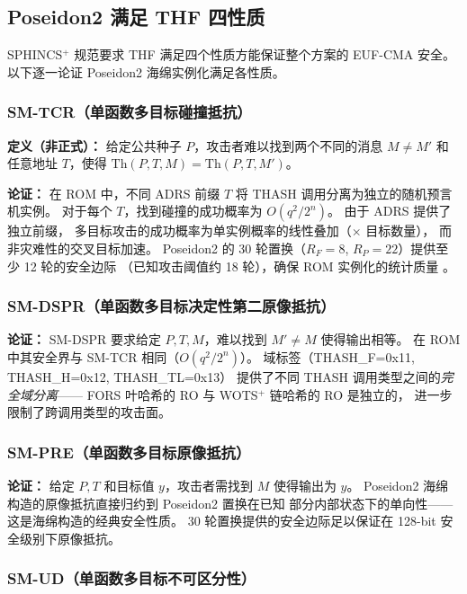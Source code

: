 \documentclass[11pt,a4paper]{ctexart}
\begin{document}
\subsection{Poseidon2 满足 THF 四性质}

SPHINCS$^+$ 规范要求 THF 满足四个性质方能保证整个方案的 EUF-CMA 安全。
以下逐一论证 Poseidon2 海绵实例化满足各性质。

\subsubsection{SM-TCR（单函数多目标碰撞抵抗）}

\textbf{定义（非正式）：}
给定公共种子 $P$，攻击者难以找到两个不同的消息 $M \neq M'$
和任意地址 $T$，使得 $\mathrm{Th}(P, T, M) = \mathrm{Th}(P, T, M')$。

\textbf{论证：}
在 ROM 中，不同 ADRS 前缀 $T$ 将 THASH 调用分离为独立的随机预言机实例。
对于每个 $T$，找到碰撞的成功概率为 $O(q^2 / 2^n)$。
由于 ADRS 提供了独立前缀，
多目标攻击的成功概率为单实例概率的线性叠加（$\times$ 目标数量），
而非灾难性的交叉目标加速。
Poseidon2 的 30 轮置换（$R_F=8$, $R_P=22$）提供至少 12 轮的安全边际
（已知攻击阈值约 18 轮），确保 ROM 实例化的统计质量 \cite{2021Security}。

\subsubsection{SM-DSPR（单函数多目标决定性第二原像抵抗）}

\textbf{论证：}
SM-DSPR 要求给定 $P, T, M$，难以找到 $M' \neq M$ 使得输出相等。
在 ROM 中其安全界与 SM-TCR 相同（$O(q^2 / 2^n)$）。
域标签（THASH\_F=0x11, THASH\_H=0x12, THASH\_TL=0x13）
提供了不同 THASH 调用类型之间的\emph{完全域分离}——
FORS 叶哈希的 RO 与 WOTS$^+$ 链哈希的 RO 是独立的，
进一步限制了跨调用类型的攻击面。

\subsubsection{SM-PRE（单函数多目标原像抵抗）}

\textbf{论证：}
给定 $P, T$ 和目标值 $y$，攻击者需找到 $M$ 使得输出为 $y$。
Poseidon2 海绵构造的原像抵抗直接归约到 Poseidon2 置换在已知
部分内部状态下的单向性——这是海绵构造的经典安全性质。
30 轮置换提供的安全边际足以保证在 128-bit 安全级别下原像抵抗。

\subsubsection{SM-UD（单函数多目标不可区分性）}
\end{document}
